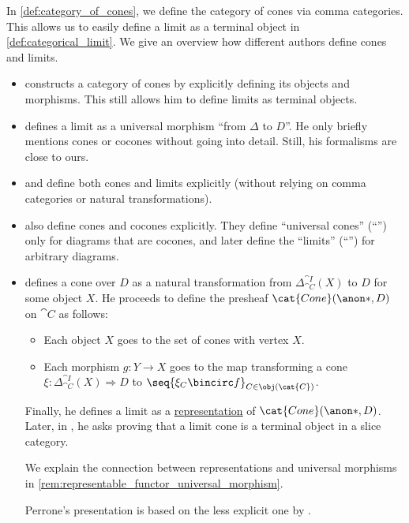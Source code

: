 \begin{remark}\label{rem:categorical_limit_definition}
  In \cref{def:category_of_cones}, we define the category of cones via comma categories. This allows us to easily define a limit as a terminal object in \cref{def:categorical_limit}. We give an overview how different authors define cones and limits.

  \begin{itemize}
    \item \Textcite[101; 102]{Awodey2010CategoryTheory} constructs a category of cones by explicitly defining its objects and morphisms. This still allows him to define limits as terminal objects.

    \item \Textcite[67]{MacLane1998CategoryTheory} defines a limit as a universal morphism \enquote{from \( \Delta \) to \( D \)}. He only briefly mentions cones or cocones without going into detail. Still, his formalisms are close to ours.

    \item \Textcite[def. 5.1.19]{Leinster2014BasicCategoryTheory} and \textcite[\S 7.1]{Schubert1972Categories} define both cones and limits explicitly (without relying on comma categories or natural transformations).

    \item \Textcite[22; 32; 152]{ЦаленкоШульгейфер1974ОсновыТеорииКатегорий} also define cones and cocones explicitly. They define \enquote{universal cones} (\enquote{}) only for diagrams that are cocones, and later define the \enquote{limits} (\enquote{}) for arbitrary diagrams.

    \item \Textcite[\S 3.1]{Perrone2024StartingCategoryTheory} defines a cone over \( D \) as a natural transformation from \( \Delta_{\cat{C}}^{\cat{I}}(X) \) to \( D \) for some object \( X \). He proceeds to define the presheaf \( \cat{Cone}(\anon*, D) \) on \( \cat{C} \) as follows:
    \begin{itemize}
      \item Each object \( X \) goes to the set of cones with vertex \( X \).
      \item Each morphism \( g: Y \to X \) goes to the map transforming a cone \( \xi: \Delta_{\cat{C}}^{\cat{I}}(X) \Rightarrow D \) to \( \seq{ \xi_C \bincirc f }_{C \in \obj(\cat{C})} \).
    \end{itemize}

    Finally, he defines a limit as a \hyperref[def:functor_representation]{representation} of \( \cat{Cone}(\anon*, D) \). Later, in \cite[exerc. 3.2.48]{Perrone2024StartingCategoryTheory}, he asks proving that a limit cone is a terminal object in a slice category.

    We explain the connection between representations and universal morphisms in \cref{rem:representable_functor_universal_morphism}.

    Perrone's presentation is based on the less explicit one by \textcite[\S 3.1]{Riehl2016CategoryTheory}.
  \end{itemize}
\end{remark}

